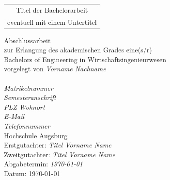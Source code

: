 \documentclass[12pt,a4paper,%
	             twoside,   %
	             openright,%
               titlepage,
               DIV12,
               pagesize=dvips,%
               headinclude,
               footinclude=false,%
               cleardoublepage=empty,%
               parskip=half,      %
               ]{scrbook}
\begin{document}


\setcounter{page}{1}

\begin{titlepage}
{
\large \sffamily
{\centering\begin{tabular}{c} \toprule
\LARGE Titel der Bachelorarbeit \\
\large eventuell mit einem Untertitel \\ \bottomrule
\end{tabular}\par}

\vspace{8ex}
\large%

\noindent Abschlussarbeit\\[5ex]
zur Erlangung des akademischen Grades eine(s/r) \\
Bachelors of Engineering in Wirtschaftsingenieurwesen\\[8ex]

vorgelegt von \emph{Vorname Nachname}\\[1ex]
\small%
\\
\emph{Matrikelnummer}\\[1ex]
\emph{Semesteranschrift}\\
\emph{PLZ Wohnort}\\[1ex]
\emph{E-Mail}\\
\emph{Telefonnummer}\\[3ex] 
\small Hochschule Augsburg\\[10ex]
\small Erstgutachter: \emph{Titel Vorname Name}\\
\small Zweitgutachter: \emph{Titel Vorname Name}\\[8ex]
\small Abgabetermin: \emph{\today}\\
\normalsize Datum: \today
}
\end{titlepage}

%
\tableofcontents


\clearemptydoublepage\cleardoubleemptypage
\setcounter{page}{1}
\end{document}
